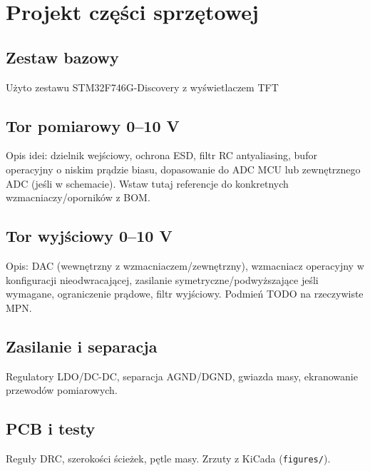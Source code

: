 \section{Projekt części sprzętowej}
\subsection{Zestaw bazowy}
Użyto zestawu STM32F746G-Discovery z wyświetlaczem TFT
\subsection{Tor pomiarowy 0–10 V}
Opis idei: dzielnik wejściowy, ochrona ESD, filtr RC antyaliasing, bufor operacyjny o niskim prądzie biasu,
dopasowanie do ADC MCU lub zewnętrznego ADC (jeśli w schemacie). Wstaw tutaj referencje do konkretnych wzmacniaczy/oporników z BOM.

\subsection{Tor wyjściowy 0–10 V}
Opis: DAC (wewnętrzny z wzmacniaczem/zewnętrzny), wzmacniacz operacyjny w konfiguracji nieodwracającej,
zasilanie symetryczne/podwyższające jeśli wymagane, ograniczenie prądowe, filtr wyjściowy. Podmień TODO na rzeczywiste MPN.

\subsection{Zasilanie i separacja}
Regulatory LDO/DC-DC, separacja AGND/DGND, gwiazda masy, ekranowanie przewodów pomiarowych.

\subsection{PCB i testy}
Reguły DRC, szerokości ścieżek, pętle masy. Zrzuty z KiCada (\texttt{figures/}).